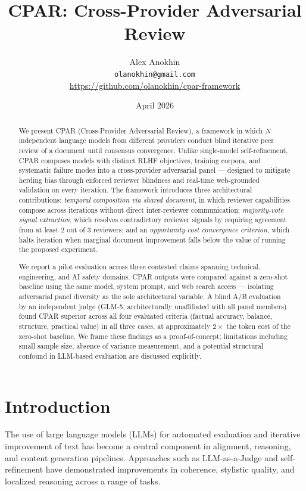 \documentclass[11pt, a4paper]{article}
\title{\textbf{CPAR: Cross-Provider Adversarial Review}}
\author{Alex Anokhin\\
\small\texttt{olanokhin@gmail.com}\\
\small\url{https://github.com/olanokhin/cpar-framework}}
\date{April 2026}
\begin{document}
\maketitle

\begin{abstract}
We present CPAR (Cross-Provider Adversarial Review), a framework in which $N$ independent language models from different providers conduct blind iterative peer review of a document until consensus convergence. Unlike single-model self-refinement, CPAR composes models with distinct RLHF objectives, training corpora, and systematic failure modes into a cross-provider adversarial panel --- designed to mitigate herding bias through enforced reviewer blindness and real-time web-grounded validation on every iteration. The framework introduces three architectural contributions: \textit{temporal composition via shared document}, in which reviewer capabilities compose across iterations without direct inter-reviewer communication; \textit{majority-vote signal extraction}, which resolves contradictory reviewer signals by requiring agreement from at least 2 out of 3 reviewers; and an \textit{opportunity-cost convergence criterion}, which halts iteration when marginal document improvement falls below the value of running the proposed experiment.

We report a pilot evaluation across three contested claims spanning technical, engineering, and AI safety domains. CPAR outputs were compared against a zero-shot baseline using the same model, system prompt, and web search access --- isolating adversarial panel diversity as the sole architectural variable. A blind A/B evaluation by an independent judge (GLM-5, architecturally unaffiliated with all panel members) found CPAR superior across all four evaluated criteria (factual accuracy, balance, structure, practical value) in all three cases, at approximately $2\times$ the token cost of the zero-shot baseline. We frame these findings as a proof-of-concept; limitations including small sample size, absence of variance measurement, and a potential structural confound in LLM-based evaluation are discussed explicitly.
\end{abstract}

\section{Introduction}

The use of large language models (LLMs) for automated evaluation and iterative improvement of text has become a central component in alignment, reasoning, and content generation pipelines. Approaches such as LLM-as-a-Judge and self-refinement have demonstrated improvements in coherence, stylistic quality, and localized reasoning across a range of tasks.
\end{document}
